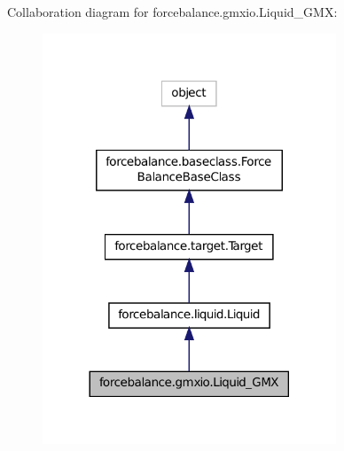 Collaboration diagram for forcebalance.\-gmxio.\-Liquid\-\_\-\-G\-M\-X\-:
\nopagebreak
\begin{figure}[H]
\begin{center}
\leavevmode
\includegraphics[width=248pt]{classforcebalance_1_1gmxio_1_1Liquid__GMX__coll__graph}
\end{center}
\end{figure}
